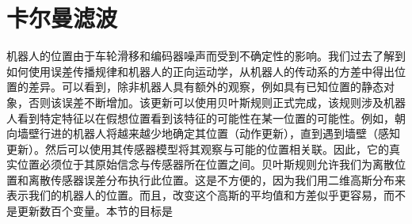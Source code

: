 
\section {卡尔曼滤波}

机器人的位置由于车轮滑移和编码器噪声而受到不确定性的影响。我们过去了解到如何使用误差传播规律和机器人的正向运动学，从机器人的传动系的方差中得出位置的差异。可以看到，除非机器人具有额外的观察，例如具有已知位置的静态对象，否则该误差不断增加。该更新可以使用贝叶斯规则正式完成，该规则涉及机器人看到特定特征以在假想位置看到该特征的可能性在某一位置的可能性。例如，朝向墙壁行进的机器人将越来越少地确定其位置（动作更新），直到遇到墙壁（感知更新）。然后可以使用其传感器模型将其观察与可能的位置相关联。因此，它的真实位置必须位于其原始信念与传感器所在位置之间。贝叶斯规则允许我们为离散位置和离散传感器误差分布执行此位置。这是不方便的，因为我们用二维高斯分布来表示我们的机器人的位置。而且，改变这个高斯的平均值和方差似乎更容易，而不是更新数百个变量。本节的目标是

